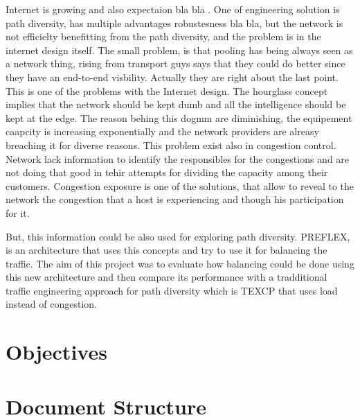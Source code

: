 Internet is growing and also expectaion bla bla . One of  engineering solution is path diversity, has multiple advantages robustesness bla bla, but the network is not efficielty benefitting from the path diversity, and the problem is in the internet design itself. The small problem, is that pooling has being always seen as a network thing, rising from transport guys says that they could do better since they have an end-to-end visbility. Actually they are right about the last point. This is one of the problems with the Internet design. The hourglass concept implies that the network should be kept dumb and all the intelligence should be kept at the edge. The reason behing this dogmm are diminishing, the equipement caapcity is increasing exponentially and the network providers are alreasy breaching it for diverse reasons. This problem exist also in congestion control. Network lack  information to identify the responsibles for the congestions and are not doing that good in tehir attempts for dividing the capacity among their customers. Congestion exposure is one of the solutions, that allow to reveal to the network the congestion that a host is experiencing and though his participation for it.

But, this information could be also used for exploring path diversity. PREFLEX, is an architecture that uses this concepts and try to use it for balancing the traffic. The aim of this project was to evaluate how balancing could be done using this new architecture and then compare its performance with a tradditional traffic engineering approach for path diversity which is TEXCP that uses load instead of congestion.

\section{Objectives}
\section{Document Structure}

